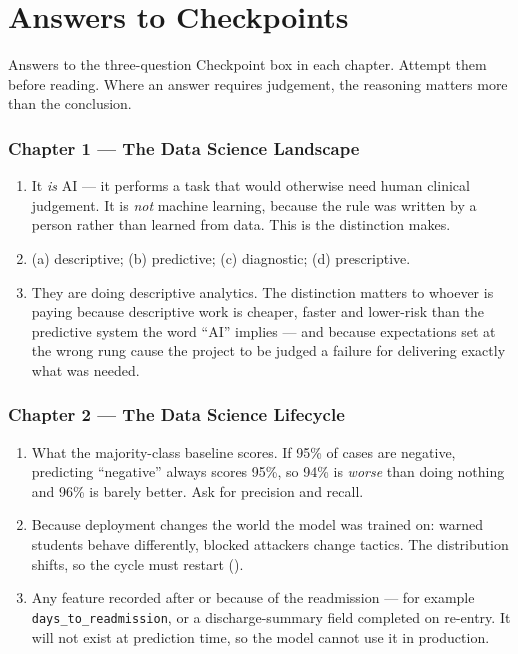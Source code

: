 \chapter{Answers to Checkpoints}\label{app:answers}
\normalfigures

Answers to the three-question Checkpoint box in each chapter. Attempt them before
reading. Where an answer requires judgement, the reasoning matters more than the
conclusion.

\newcommand{\ansch}[1]{\subsection*{\color{primary}Chapter #1}}
\newenvironment{ans}{\begin{enumerate}[leftmargin=*, itemsep=4pt, topsep=3pt,
  label=\textbf{\arabic*.}]}{\end{enumerate}}

\ansch{1 --- The Data Science Landscape}
\begin{ans}
  \item It \emph{is} AI --- it performs a task that would otherwise need human
        clinical judgement. It is \emph{not} machine learning, because the rule was
        written by a person rather than learned from data. This is the distinction
         makes.
  \item (a) descriptive; (b) predictive; (c) diagnostic; (d) prescriptive.
  \item They are doing descriptive analytics. The distinction matters to whoever is
        paying because descriptive work is cheaper, faster and lower-risk than the
        predictive system the word ``AI'' implies --- and because expectations set at
        the wrong rung cause the project to be judged a failure for delivering
        exactly what was needed.
\end{ans}

\ansch{2 --- The Data Science Lifecycle}
\begin{ans}
  \item What the majority-class baseline scores. If 95\% of cases are negative,
        predicting ``negative'' always scores 95\%, so 94\% is \emph{worse} than
        doing nothing and 96\% is barely better. Ask for precision and recall.
  \item Because deployment changes the world the model was trained on: warned
        students behave differently, blocked attackers change tactics. The
        distribution shifts, so the cycle must restart ().
  \item Any feature recorded after or because of the readmission --- for example
        \texttt{days\_to\_readmission}, or a discharge-summary field completed on
        re-entry. It will not exist at prediction time, so the model cannot use it in
        production.
\end{ans}

